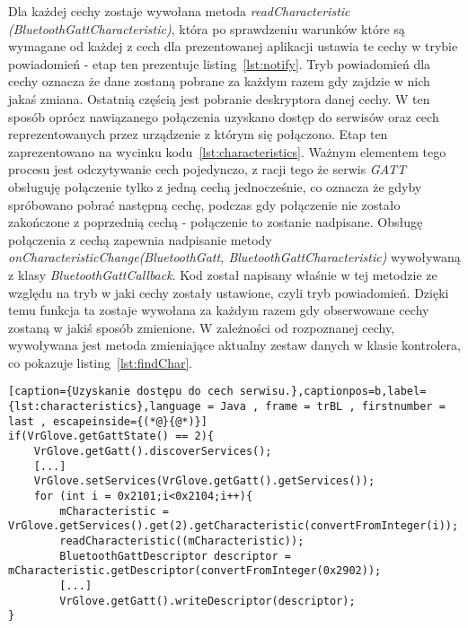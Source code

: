 Dla każdej cechy zostaje wywołana metoda \textit{readCharacteristic (BluetoothGattCharacteristic)}, która po sprawdzeniu warunków które są wymagane od każdej z cech dla prezentowanej aplikacji ustawia te cechy w trybie powiadomień - etap ten prezentuje listing~\ref{lst:notify}. Tryb powiadomień dla cechy oznacza że dane zostaną pobrane za każdym razem gdy zajdzie w nich jakaś zmiana. Ostatnią częścią jest pobranie deskryptora danej cechy. W ten sposób oprócz nawiązanego połączenia uzyskano dostęp do serwisów oraz cech reprezentowanych przez urządzenie z którym się połączono. Etap ten zaprezentowano na wycinku kodu~\ref{lst:characteristics}. Ważnym elementem tego procesu jest odczytywanie cech pojedynczo, z racji tego że serwis \textit{GATT} obsługuję połączenie tylko z jedną cechą jednocześnie, co oznacza że gdyby spróbowano pobrać następną cechę, podczas gdy połączenie nie zostało zakończone z poprzednią cechą - połączenie to zostanie nadpisane. Obsługę połączenia z cechą zapewnia nadpisanie metody \textit{onCharacteristicChange(BluetoothGatt, BluetoothGattCharacteristic)} wywoływaną  z klasy \textit{BluetoothGattCallback}. Kod został napisany właśnie w tej metodzie ze względu na tryb w jaki cechy zostały ustawione, czyli tryb powiadomień. Dzięki temu funkcja ta zostaje wywołana za każdym razem gdy obserwowane cechy zostaną w jakiś sposób zmienione. W zależności od rozpoznanej cechy, wywoływana jest metoda zmieniające aktualny zestaw danych w klasie kontrolera, co pokazuje listing~\ref{lst:findChar}.
\begin{lstlisting}[caption={Uzyskanie dostępu do cech serwisu.},captionpos=b,label={lst:characteristics},language = Java , frame = trBL , firstnumber = last , escapeinside={(*@}{@*)}]     
if(VrGlove.getGattState() == 2){
	VrGlove.getGatt().discoverServices();                                                   
	[...]
	VrGlove.setServices(VrGlove.getGatt().getServices());
	for (int i = 0x2101;i<0x2104;i++){
    	mCharacteristic = VrGlove.getServices().get(2).getCharacteristic(convertFromInteger(i));
        readCharacteristic((mCharacteristic));
        BluetoothGattDescriptor descriptor = mCharacteristic.getDescriptor(convertFromInteger(0x2902)); 
        [...]
        VrGlove.getGatt().writeDescriptor(descriptor);
}
\end{lstlisting}

